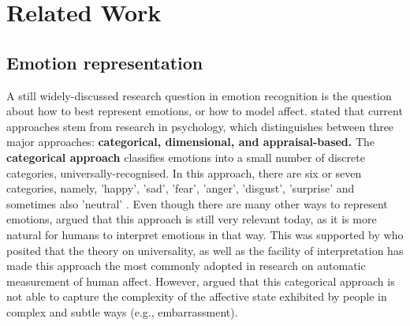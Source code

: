
\chapter{Related Work}

\section{Emotion representation}
A still widely-discussed research question in emotion recognition is the question about how to best represent emotions, or how to model affect. \citet{Gunes:2011:EmotionRepresentationContinuous} stated that current approaches stem from research in psychology, which distinguishes between three major approaches: \textbf{categorical, dimensional, and appraisal-based.}
\newline\newline
The \textbf{categorical approach} classifies emotions into a small number of discrete categories, universally-recognised. In this approach, there are six or seven categories, namely, 'happy', 'sad', 'fear', 'anger', 'disgust', 'surprise' and sometimes also 'neutral' \citep{Hupont:2010:FacialEmotionsIn2DAffectiveSpace}. Even though there are many other ways to represent emotions, \citet{Salah:2018:VideoBasedER} argued that this approach is still very relevant today, as it is more natural for humans to interpret emotions in that way. This was supported by \citet{Gunes:2011:EmotionRepresentationContinuous} who posited that the theory on universality, as well as the facility of interpretation has made this approach the most commonly adopted in research on automatic measurement of human affect.
\newline\newline
However, \citet{Gunes:2011:EmotionRepresentationContinuous} argued that this categorical approach is not able to capture the complexity of the affective state exhibited by people in complex and subtle ways (e.g., embarrassment).
